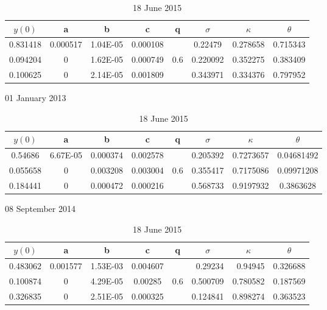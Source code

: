 \documentclass[12pt,a4paper]{article}
\theoremstyle{plain}
\numberwithin{equation}{section}
\begin{document}
\begin{table}[t]
\centering
\begin{subtable}{1.0\textwidth}
\centering
\begin{tabular}{|cccccccc|}
     \hline
    \multicolumn{1}{|c|}{$y(0)$} & \multicolumn{1}{c|}{a} & \multicolumn{1}{c|}{b} & \multicolumn{1}{c|}{c} & \multicolumn{1}{c|}{q} & \multicolumn{1}{c|}{$\sigma$} & \multicolumn{1}{c|}{$\kappa$} & $\theta$ \\
    \hline
    0.831418 & 0.000517 & 1.04E-05 & 0.000108 &       & 0.22479 & 0.278658 & 0.715343 \\
    0.094204 & 0     & 1.62E-05 & 0.000749 & 0.6 & 0.220092 & 0.352275 & 0.383409 \\
    0.100625 & 0     & 2.14E-05 & 0.001809 &       & 0.343971 & 0.334376 & 0.797952 \\
     \hline
    \end{tabular}%

\caption{01 January 2013}
\end{subtable}%

\begin{subtable}{1.0\textwidth}
\centering
\begin{tabular}{|cccccccc|}
     \hline
    \multicolumn{1}{|c|}{$y(0)$} & \multicolumn{1}{c|}{a} & \multicolumn{1}{c|}{b} & \multicolumn{1}{c|}{c} & \multicolumn{1}{c|}{q} & \multicolumn{1}{c|}{$\sigma$} & \multicolumn{1}{c|}{$\kappa$} & $\theta$ \\
    \hline
0.54686 & 6.67E-05 & 0.000374 & 0.002578 &       & 0.205392 & 0.7273657 & 0.04681492 \\
    0.055658 & 0     & 0.003208 & 0.003004 & 0.6   & 0.355417 & 0.7175086 & 0.09971208 \\
    0.184441 & 0     & 0.000472 & 0.000216 &       & 0.568733 & 0.9197932 & 0.3863628 \\
     \hline
    \end{tabular}%

\caption{08 September 2014}
\end{subtable}%

\begin{subtable}{1.0\textwidth}

\begin{tabular}{|cccccccc|}
    \hline
    \multicolumn{1}{|c|}{$y(0)$} & \multicolumn{1}{c|}{a} & \multicolumn{1}{c|}{b} & \multicolumn{1}{c|}{c} & \multicolumn{1}{c|}{q} & \multicolumn{1}{c|}{$\sigma$} & \multicolumn{1}{c|}{$\kappa$} & $\theta$ \\
     \hline
     {0.483062} & 0.001577 & 1.53E-03 & 0.004607 &       & \multicolumn{1}{r}{0.29234} & \multicolumn{1}{r}{0.94945} & {0.326688} \\
    0.100874 & 0     & 4.29E-05 & 0.00285 & \multicolumn{1}{c}{0.6} & 0.500709 & 0.780582 & 0.187569 \\
    0.326835 & 0     & 2.51E-05 & 0.000325 &       & 0.124841 & 0.898274 & 0.363523 \\
    \hline
    \end{tabular}%
\caption{18 June 2015}
\end{subtable}%


\end{table}
\end{document}
